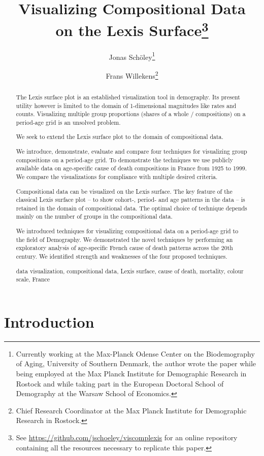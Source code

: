 \documentclass{scrartcl}
\title{Visualizing Compositional Data \\ on the Lexis Surface\footnote{See \url{https://github.com/jschoeley/viscomplexis} for an online repository containing all the resources necessary to replicate this paper.}}
\author{Jonas Schöley\footnote{Currently working at the Max-Planck Odense Center on the Biodemography of Aging, University of Southern Denmark, the author wrote the paper while being employed at the Max Planck Institute for Demographic Research in Rostock and while taking part in the European Doctoral School of Demography at the Warsaw School of Economics.} \and Frans Willekens\footnote{Chief Research Coordinator at the Max Planck Institute for Demographic Research in Rostock.}}
\begin{document}
\maketitle

\begin{abstract}

The Lexis surface plot is an established visualization tool in demography. Its present utility however is limited to the domain of 1-dimensional magnitudes like rates and counts. Visualizing multiple group proportions (shares of a whole / compositions) on a period-age grid is an unsolved problem.

We seek to extend the Lexis surface plot to the domain of compositional data.

We introduce, demonstrate, evaluate and compare four techniques for visualizing group compositions on a period-age grid. To demonstrate the techniques we use publicly available data on age-specific cause of death compositions in France from 1925 to 1999. We compare the visualizations for compliance with multiple desired criteria.

Compositional data can be visualized on the Lexis surface. The key feature of the classical Lexis surface plot -- to show cohort-, period- and age patterns in the data -- is retained in the domain of compositional data. The optimal choice of technique depends mainly on the number of groups in the compositional data.

We introduced techniques for visualizing compositional data on a period-age grid to the field of Demography. We demonstrated the novel techniques by performing an exploratory analysis of age-specific French cause of death patterns across the 20th century. We identified strength and weaknesses of the four proposed techniques.

\bigskip{}
data visualization, compositional data, Lexis surface, cause of death, mortality, colour scale, France

\end{abstract}

\clearpage


\section{Introduction} %
\label{sec:intro}
\end{document}
